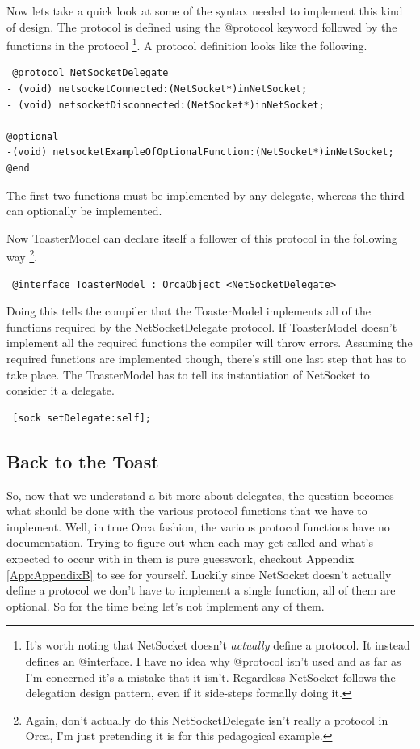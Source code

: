 \documentclass[12pt,a4paper]{article}
\begin{document}
Now lets take a quick look at some of the syntax needed to implement this kind of design.
The protocol is defined using the @protocol keyword followed by the functions in the protocol
\footnote
{
It's worth noting that NetSocket doesn't \emph{actually} define a protocol.
 It instead defines an @interface.
 I have no idea why @protocol isn't used and as far as I'm concerned it's a mistake that it isn't.
 Regardless NetSocket follows the delegation design pattern, even if it side-steps formally doing it.
 }.
 A protocol definition looks like the following.
 \begin{lstlisting}
 @protocol NetSocketDelegate
- (void) netsocketConnected:(NetSocket*)inNetSocket;
- (void) netsocketDisconnected:(NetSocket*)inNetSocket; 

@optional
-(void) netsocketExampleOfOptionalFunction:(NetSocket*)inNetSocket;
@end
 \end{lstlisting}
 The first two functions must be implemented by any delegate, whereas the third can optionally be implemented.
 
 Now ToasterModel can declare itself a follower of this protocol in the following way
 \footnote{Again, don't actually do this NetSocketDelegate isn't really a protocol in Orca, I'm just pretending it is for this pedagogical example.}.
  \begin{lstlisting}
 @interface ToasterModel : OrcaObject <NetSocketDelegate>
 \end{lstlisting}
Doing this tells the compiler that the ToasterModel implements all of the functions required by the NetSocketDelegate protocol.
If ToasterModel doesn't implement all the required functions the compiler will throw errors.
Assuming the required functions are implemented though, there's still one last step that has to take place.
The ToasterModel has to tell its instantiation of NetSocket to consider it a delegate. 
\begin{lstlisting}
 [sock setDelegate:self];  
\end{lstlisting}

\subsection{Back to the Toast}
So, now that we understand a bit more about delegates, the question becomes what should be done with the various protocol functions that we have to implement.
Well, in true Orca fashion, the various protocol functions have no documentation. 
Trying to figure out when each may get called and what's expected to occur with in them is pure guesswork, checkout Appendix \ref{App:AppendixB} to see for yourself. 
Luckily since NetSocket doesn't actually define a protocol we don't have to implement a single function, all of them are optional. 
So for the time being let's not implement any of them. 
\end{document}
